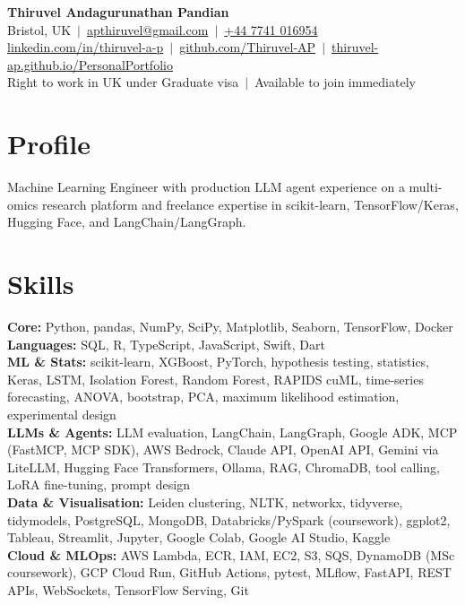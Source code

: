 \documentclass[a4paper,11pt]{article}
\begin{document}
\fontsize{11}{13.2}\selectfont

\begin{center}
  {\LARGE\bfseries Thiruvel Andagurunathan Pandian}\\[3pt]
  Bristol, UK \,$|$\, \href{mailto:apthiruvel@gmail.com}{apthiruvel@gmail.com} \,$|$\, \href{tel:+447741016954}{+44 7741 016954}\\[1pt]
\href{https://www.linkedin.com/in/thiruvel-a-p/}{linkedin.com/in/thiruvel-a-p} \,$|$\, \href{https://github.com/Thiruvel-AP}{github.com/Thiruvel-AP} \,$|$\, \href{https://thiruvel-ap.github.io/PersonalPortfolio/}{thiruvel-ap.github.io/PersonalPortfolio}\\[1pt]
  Right to work in UK under Graduate visa \,$|$\, Available to join immediately
\end{center}

\section{Profile}
Machine Learning Engineer with production LLM agent experience on a multi-omics research platform and freelance expertise in scikit-learn, TensorFlow/Keras, Hugging Face, and LangChain/LangGraph.

\section{Skills}
\textbf{Core:} Python, pandas, NumPy, SciPy, Matplotlib, Seaborn, TensorFlow, Docker\\[2pt]
\textbf{Languages:} SQL, R, TypeScript, JavaScript, Swift, Dart\\[2pt]
\textbf{ML \& Stats:} scikit-learn, XGBoost, PyTorch, hypothesis testing, statistics, Keras, LSTM, Isolation Forest, Random Forest, RAPIDS cuML, time-series forecasting, ANOVA, bootstrap, PCA, maximum likelihood estimation, experimental design\\[2pt]
\textbf{LLMs \& Agents:} LLM evaluation, LangChain, LangGraph, Google ADK, MCP (FastMCP, MCP SDK), AWS Bedrock, Claude API, OpenAI API, Gemini via LiteLLM, Hugging Face Transformers, Ollama, RAG, ChromaDB, tool calling, LoRA fine-tuning, prompt design\\[2pt]
\textbf{Data \& Visualisation:} Leiden clustering, NLTK, networkx, tidyverse, tidymodels, PostgreSQL, MongoDB, Databricks/PySpark (coursework), ggplot2, Tableau, Streamlit, Jupyter, Google Colab, Google AI Studio, Kaggle\\[2pt]
\textbf{Cloud \& MLOps:} AWS Lambda, ECR, IAM, EC2, S3, SQS, DynamoDB (MSc coursework), GCP Cloud Run, GitHub Actions, pytest, MLflow, FastAPI, REST APIs, WebSockets, TensorFlow Serving, Git
\end{document}
